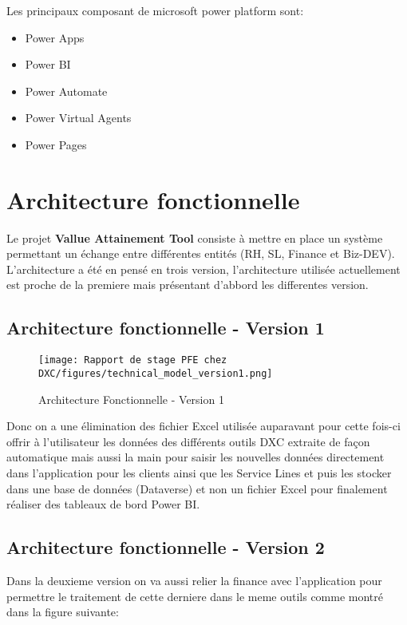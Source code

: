 Les principaux composant de microsoft power platform sont:
\\

\begin{itemize}
  \item Power Apps 
  \item Power BI 
  \item Power Automate
  \item Power Virtual Agents
  \item Power Pages
\end{itemize}




\section{Architecture fonctionnelle}

Le projet \textbf{Vallue Attainement Tool} consiste à mettre en place un système permettant un
échange entre différentes entités (RH, SL, Finance et Biz-DEV).
\\

L'architecture a été en pensé en trois version, l'architecture utilisée actuellement est proche de la premiere mais présentant d'abbord les differentes version.

\subsection{Architecture fonctionnelle - Version 1}

\begin{figure}[!h]
    \centering
    \texttt{[image: Rapport de stage PFE chez DXC/figures/technical\_model\_version1.png]}
    \caption{Architecture Fonctionnelle - Version 1}
\end{figure}

Donc on a une élimination des fichier Excel utilisée auparavant pour cette fois-ci offrir à l'utilisateur les données des différents outils DXC extraite de façon automatique mais aussi la main pour saisir les nouvelles données directement dans l'application pour les clients ainsi que les Service Lines et puis les stocker dans une base de données (Dataverse) et non un fichier Excel pour finalement réaliser des tableaux de bord Power BI.


\newpage
\subsection{Architecture fonctionnelle - Version 2}
Dans la deuxieme version on va aussi relier la finance avec l'application pour permettre le traitement de cette derniere dans le meme outils comme montré dans la figure suivante:

